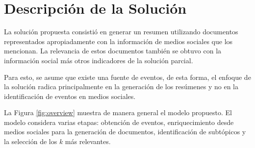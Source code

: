 

\chapter{Descripción de la Solución}
\label{sec-4}

\label{cap:solucion}

  La solución propuesta consistió en generar un resumen utilizando
  documentos representados apropiadamente con la información de medios
  sociales que los mencionan. La relevancia de estos documentos
  también se obtuvo con la información social más otros indicadores de
  la solución parcial.

  Para esto, se asume que existe una fuente de eventos, de esta forma,
  el enfoque de la solución radica principalmente en la generación de
  los resúmenes y no en la identificación de eventos en medios
  sociales.

  La Figura \ref{fig:overview} muestra de manera general el modelo
  propuesto. El modelo considera varias etapas: obtención de eventos,
  enriquecimiento desde medios sociales para la generación de
  documentos, identificación de subtópicos y la selección de los $k$
  más relevantes.

